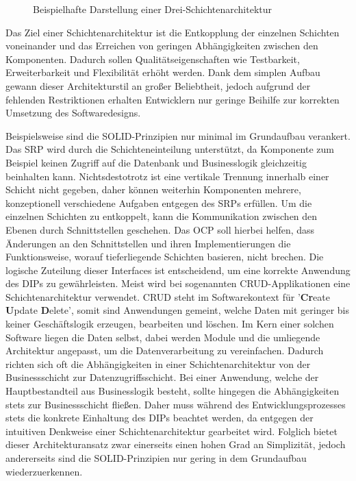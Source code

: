 \begin{figure}[htbp]
	\centering
	\large
	
	\caption{Beispielhafte Darstellung einer Drei-Schichtenarchitektur}
	\label{fig:Schichtenarchitektur}
\end{figure}

Das Ziel einer Schichtenarchitektur ist die Entkopplung der einzelnen Schichten voneinander und das Erreichen von geringen Abhängigkeiten zwischen den Komponenten. Dadurch sollen Qualitätseigenschaften wie Testbarkeit, Erweiterbarkeit und Flexibilität erhöht werden. Dank dem simplen Aufbau gewann dieser Architekturstil an großer Beliebtheit, jedoch aufgrund der fehlenden Restriktionen erhalten Entwicklern nur geringe Beihilfe zur korrekten Umsetzung des Softwaredesigns. 

Beispielsweise sind die SOLID-Prinzipien nur minimal im Grundaufbau verankert. Das \acrlong{SRP} wird durch die Schichteneinteilung unterstützt, da Komponente zum Beispiel keinen Zugriff auf die Datenbank und Businesslogik gleichzeitig beinhalten kann. Nichtsdestotrotz ist eine vertikale Trennung innerhalb einer Schicht nicht gegeben, daher können weiterhin Komponenten mehrere, konzeptionell verschiedene Aufgaben entgegen des SRPs erfüllen. Um die einzelnen Schichten zu entkoppelt, kann die Kommunikation zwischen den Ebenen durch Schnittstellen geschehen. Das \acrlong{OCP} soll hierbei helfen, dass Änderungen an den Schnittstellen und ihren Implementierungen die Funktionsweise, worauf tieferliegende Schichten basieren, nicht brechen. Die logische Zuteilung dieser Interfaces ist entscheidend, um eine korrekte Anwendung des \acrlong{DIP}s zu gewährleisten. Meist wird bei sogenannten CRUD-Applikationen eine Schichtenarchitektur verwendet. \acrshort{CRUD} steht im Softwarekontext für '\textbf{Cr}eate \textbf{U}pdate \textbf{D}elete', somit sind Anwendungen gemeint, welche Daten mit geringer bis keiner Geschäftslogik erzeugen, bearbeiten und löschen. Im Kern einer solchen Software liegen die Daten selbst, dabei werden Module und die umliegende Architektur angepasst, um die Datenverarbeitung zu vereinfachen. Dadurch richten sich oft die Abhängigkeiten in einer Schichtenarchitektur von der Businessschicht zur Datenzugriffsschicht. Bei einer Anwendung, welche der Hauptbestandteil aus Businesslogik besteht, sollte hingegen die Abhängigkeiten stets zur Businessschicht fließen. Daher muss während des Entwicklungsprozesses stets die konkrete Einhaltung des DIPs beachtet werden, da entgegen der intuitiven Denkweise einer Schichtenarchitektur gearbeitet wird. Folglich bietet dieser Architekturansatz zwar einerseits einen hohen Grad an Simplizität, jedoch andererseits sind die SOLID-Prinzipien nur gering in dem Grundaufbau wiederzuerkennen.



